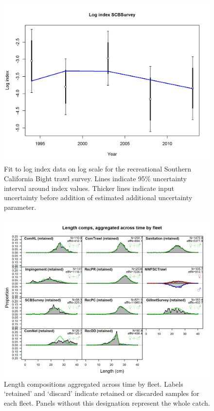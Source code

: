 \documentclass[12pt,]{article}
\begin{document}
\begin{figure}[htbp]
\centering
\includegraphics{r4ss/plots_mod1/index5_logcpuefit_SCBSurvey.png}
\caption{Fit to log index data on log scale for the recreational
Southern California Bight trawl survey. Lines indicate 95\% uncertainty
interval around index values. Thicker lines indicate input uncertainty
before addition of estimated additional uncertainty parameter.
\label{fig:index5_logcpuefit_SCBSurvey}}
\end{figure}

\begin{figure}[htbp]
\centering
\includegraphics{r4ss/plots_mod1/comp_lenfit__aggregated_across_time.png}
\caption{Length compositions aggregated across time by fleet. Labels
`retained' and `discard' indicate retained or discarded samples for each
fleet. Panels without this designation represent the whole catch.
\label{fig:comp_lenfit__aggregated_across_time}}
\end{figure}
\end{document}
